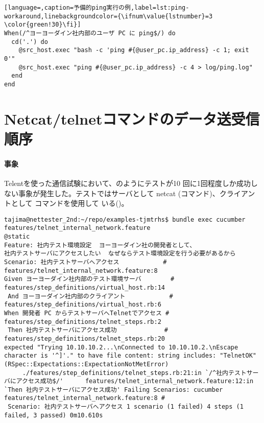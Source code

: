 \begin{lstlisting}[language=,caption=予備的ping実行の例,label=lst:ping-workaround,linebackgroundcolor={\ifnum\value{lstnumber}=3 \color{green!30}\fi}]
When(/^ヨーヨーダイン社内部のユーザ PC に ping$/) do
  cd('.') do
    @src_host.exec "bash -c 'ping #{@user_pc.ip_address} -c 1; exit 0'"
    @src_host.exec "ping #{@user_pc.ip_address} -c 4 > log/ping.log"
  end
end
\end{lstlisting}

 \section{Netcat/telnetコマンドのデータ送受信順序}
 \label{sec:telnet-probrem}

    \paragraph{事象}
Telentを使った通信試験において、のようにテストが10
回に1回程度しか成功しない事象が発生した。テストではサーバとして netcat
(コマンド)、クライアントとして コマンドを使用して
いる()。
 
\begin{lstlisting}[caption=Telnetテストシナリオ,label=lst:telnet-bk]
tajima@nettester_2nd:~/repo/examples-tjmtrhs$ bundle exec cucumber features/telnet_internal_network.feature
@static
Feature: 社内テスト環境設定  ヨーヨーダイン社の開発者として、
社内テストサーバにアクセスしたい  なぜならテスト環境設定を行う必要があるから
Scenario: 社内テストサーバへアクセス            # features/telnet_internal_network.feature:8
Given ヨーヨーダイン社内部のテスト環境サーバ        # features/step_definitions/virtual_host.rb:14
 And ヨーヨーダイン社内部のクライアント            # features/step_definitions/virtual_host.rb:6
When 開発者 PC からテストサーバへTelnetでアクセス # features/step_definitions/telnet_steps.rb:2
 Then 社内テストサーバにアクセス成功             # features/step_definitions/telnet_steps.rb:20
expected "Trying 10.10.10.2...\nConnected to 10.10.10.2.\nEscape character is '^]'." to have file content: string includes: "TelnetOK" (RSpec::Expectations::ExpectationNotMetError)
     ./features/step_definitions/telnet_steps.rb:21:in `/^社内テストサーバにアクセス成功$/'      features/telnet_internal_network.feature:12:in `Then 社内テストサーバにアクセス成功' Failing Scenarios: cucumber features/telnet_internal_network.feature:8 #
 Scenario: 社内テストサーバへアクセス 1 scenario (1 failed) 4 steps (1 failed, 3 passed) 0m10.610s
\end{lstlisting}

